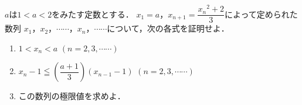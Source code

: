 \documentclass[../../main.tex]{subfiles}
\begin{document}
$a$は$1<a<2$をみたす定数とする．
$x_1=a$，$\displaystyle x_{n+1}=\dfrac{{x_n}^2+2}{3}$によって定められた数列
$x_1$，$x_2$，$\cdots\cdots$，$x_n$，$\cdots\cdots$について，次の各式を証明せよ．
\begin{enumerate}
  \item $1<x_n<a$ $(n=2,3,\cdots\cdots)$
  \item $\displaystyle x_n-1 \leqq \left( \dfrac{a+1}{3} \right) (x_{n-1}-1)$ $(n=2,3,\cdots\cdots)$
  \item この数列の極限値を求めよ．
\end{enumerate}
\end{document}
